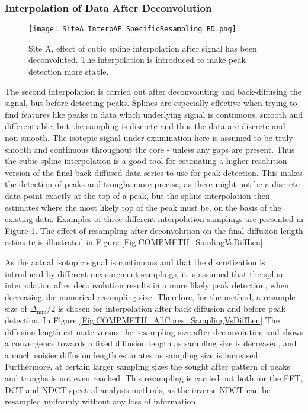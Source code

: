 \documentclass[../../CompleteThesis2/Complete_2ndDraft]{subfiles}
\begin{document}
\subsubsection[Interpolation 2]{Interpolation of Data After Deconvolution}
\label{Subsubsec:METH_Interpolation_AFdecon}
\begin{figure}[!htb]
	\centering
	\texttt{[image: SiteA\_InterpAF\_SpecificResampling\_BD.png]}
	\caption[Back diffused data, Site A, different resamplings after deconvolution.]{\small Site A, effect of cubic spline interpolation after signal has been deconvoluted. The interpolation is introduced to make peak detection more stable.}
	\label{Fig:COMPMETH_SiteA_InterpAF_4samplings}
\end{figure}

The second interpolation is carried out after deconvoluting and back-diffusing the signal, but before detecting peaks. Splines are especially effective when trying to find features like peaks in data which underlying signal is continuous, smooth and differentiable, but the sampling is discrete and thus the data are discrete and non-smooth. The isotopic signal under examination here is assumed to be truly smooth and continuous throughout the core - unless any gaps are present. Thus the cubic spline interpolation is a good tool for estimating a higher resolution version of the final back-diffused data series to use for peak detection. This makes the detection of peaks and troughs more precise, as there might not be a discrete data point exactly at the top of a peak, but the spline interpolation then estimates where the most likely top of the peak must be, on the basis of the existing data. Examples of three different interpolation samplings are presented in Figure \ref{Fig:COMPMETH_SiteA_InterpAF_4samplings}. The effect of resampling after deconvolution on the final diffusion length estimate is illustrated in Figure \ref{Fig:COMPMETH_SamlingVsDiffLen}. 

As the actual isotopic signal is continuous and that the discretization is introduced by different measurement samplings, it is assumed that the spline interpolation after deconvolution results in a more likely peak detection, when decreasing the numerical resampling size. Therefore, for the method, a resample size of $\Delta_{\text{min}}/2$ is chosen for interpolation after back diffusion and before peak detection. In Figure \ref{Fig:COMPMETH_AllCores_SamplingVsDiffLen} The diffusion length estimate versus the resampling size after deconvolution and shows a convergence towards a fixed diffusion length as sampling size is decreased, and a much noisier diffusion length estimates as sampling size is increased. Furthermore, at certain larger sampling sizes the sought after pattern of peaks and troughs is not even reached. This resampling is carried out both for the FFT, DCT and NDCT spectral analysis methods, as the inverse NDCT can be resampled uniformly without any loss of information.
\end{document}
